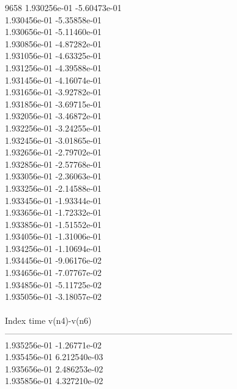 9658	1.930256e-01	-5.60473e-01	\\ 	1.930456e-01	-5.35858e-01	\\ 	1.930656e-01	-5.11460e-01	\\ 	1.930856e-01	-4.87282e-01	\\ 	1.931056e-01	-4.63325e-01	\\ 	1.931256e-01	-4.39588e-01	\\ 	1.931456e-01	-4.16074e-01	\\ 	1.931656e-01	-3.92782e-01	\\ 	1.931856e-01	-3.69715e-01	\\ 	1.932056e-01	-3.46872e-01	\\ 	1.932256e-01	-3.24255e-01	\\ 	1.932456e-01	-3.01865e-01	\\ 	1.932656e-01	-2.79702e-01	\\ 	1.932856e-01	-2.57768e-01	\\ 	1.933056e-01	-2.36063e-01	\\ 	1.933256e-01	-2.14588e-01	\\ 	1.933456e-01	-1.93344e-01	\\ 	1.933656e-01	-1.72332e-01	\\ 	1.933856e-01	-1.51552e-01	\\ 	1.934056e-01	-1.31006e-01	\\ 	1.934256e-01	-1.10694e-01	\\ 	1.934456e-01	-9.06176e-02	\\ 	1.934656e-01	-7.07767e-02	\\ 	1.934856e-01	-5.11725e-02	\\ 	1.935056e-01	-3.18057e-02	\\ \hline
\\ \hline
Index   time            v(n4)-v(n6)     \\ \hline
--------------------------------------------------------------------------------\\ 	1.935256e-01	-1.26771e-02	\\ 	1.935456e-01	6.212540e-03	\\ 	1.935656e-01	2.486253e-02	\\ 	1.935856e-01	4.327210e-02	\\ \hline
